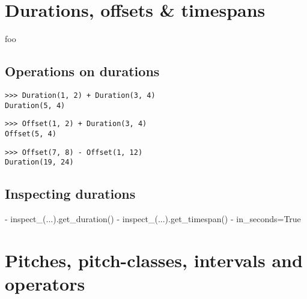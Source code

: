 \section{Durations, offsets \& timespans}

foo

\subsection{Operations on durations}

\begin{comment}
<abjad>
Duration(1, 2) + Duration(3, 4)
Offset(1, 2) + Duration(3, 4)
Offset(7, 8) - Offset(1, 12)
</abjad>
\end{comment}

\begin{abjadbookoutput}
\begin{singlespacing}
\vspace{-0.5\baselineskip}
\begin{lstlisting}
>>> Duration(1, 2) + Duration(3, 4)
Duration(5, 4)
\end{lstlisting}
\begin{lstlisting}
>>> Offset(1, 2) + Duration(3, 4)
Offset(5, 4)
\end{lstlisting}
\begin{lstlisting}
>>> Offset(7, 8) - Offset(1, 12)
Duration(19, 24)
\end{lstlisting}
\end{singlespacing}
\end{abjadbookoutput}

\subsection{Inspecting durations}

\begin{markdown}
-   inspect_(...).get_duration()
-   inspect_(...).get_timespan()
-   in_seconds=True
\end{markdown}

\section{Pitches, pitch-classes, intervals and operators}

